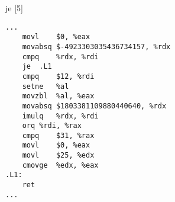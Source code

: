 \begin{figure}[H]
\begin{subfigure}[T]{0.30333333333333334\textwidth}
\begin{lrbox}{\mybox}
%
        \end{lrbox}\resizebox{\textwidth}{!}{\usebox{\mybox}}
\end{subfigure}
\begin{subfigure}[T]{0.30333333333333334\textwidth}
\caption*{}
\end{subfigure}
\begin{subfigure}[T]{0.30333333333333334\textwidth}
\caption*{}
\end{subfigure}
\hspace*{6mm}
\begin{subfigure}[T]{0.2733333333333333\textwidth}
\vspace*{2mm}\tiny je [5]
\begin{lstlisting}[style=defstyle,language={[x86masm]Assembler},basicstyle=\tiny\ttfamily,breaklines=true]
...
	movl	$0, %eax
	movabsq	$-4923303035436734157, %rdx
	cmpq	%rdx, %rdi
	je	.L1
	cmpq	$12, %rdi
	setne	%al
	movzbl	%al, %eax
	movabsq	$1803381109880440640, %rdx
	imulq	%rdx, %rdi
	orq	%rdi, %rax
	cmpq	$31, %rax
	movl	$0, %eax
	movl	$25, %edx
	cmovge	%edx, %eax
.L1:
	ret
...\end{lstlisting}
\end{subfigure}
\end{figure}
\newpage\noindent